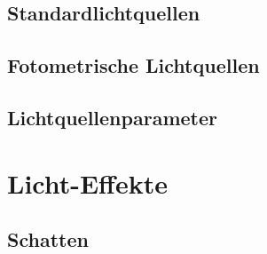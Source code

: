 \subsection{Standardlichtquellen}
\subsection{Fotometrische Lichtquellen}
\subsection{Lichtquellenparameter}
\section{Licht-Effekte}
\subsection{Schatten}





